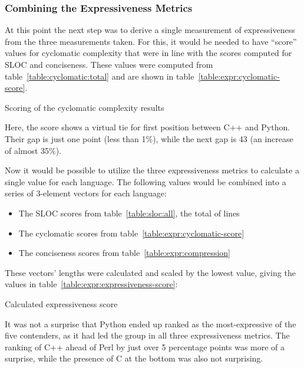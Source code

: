 \subsubsection{Combining the Expressiveness Metrics}

At this point the next step was to derive a single measurement of expressiveness from the three measurements taken. For this, it would be needed to have ``score'' values for cyclomatic complexity that were in line with the scores computed for SLOC and conciseness. These values were computed from table~\ref{table:cyclomatic:total} and are shown in table~\ref{table:expr:cyclomatic-score}.

\begin{table}[!htb]

\caption{Scoring of the cyclomatic complexity results}
\label{table:expr:cyclomatic-score}
\end{table}

Here, the score shows a virtual tie for first position between C++ and Python. Their gap is just one point (less than 1\%), while the next gap is 43 (an increase of almost 35\%).

Now it would be possible to utilize the three expressiveness metrics to calculate a single value for each language. The following values would be combined into a series of 3-element vectors for each language:

\begin{itemize}
\item The SLOC scores from table~\ref{table:sloc:all}, the total of lines
\item The cyclomatic scores from table~\ref{table:expr:cyclomatic-score}
\item The conciseness scores from table~\ref{table:expr:compression}
\end{itemize}

These vectors' lengths were calculated and scaled by the lowest value, giving the values in table~\ref{table:expr:expressiveness-score}:

\begin{table}[!htb]

\caption{Calculated expressiveness score}
\label{table:expr:expressiveness-score}
\end{table}

It was not a surprise that Python ended up ranked as the most-expressive of the five contenders, as it had led the group in all three expressiveness metrics. The ranking of C++ ahead of Perl by just over 5 percentage points was more of a surprise, while the presence of C at the bottom was also not surprising.

